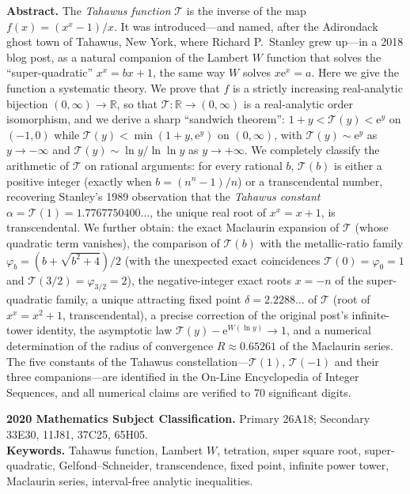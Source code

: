 \documentclass[11pt,a4paper]{article}
\theoremstyle{plain}
\theoremstyle{definition}
\theoremstyle{remark}
\newcommand{\Tah}{\mathcal{T}}                     %
\newcommand{\R}{\mathbb{R}}
\newcommand{\ee}{\mathrm{e}}
\begin{document}
\vspace{10pt}
\begin{center}
\begin{minipage}{0.88\textwidth}
\small
\textbf{Abstract.}
The \emph{Tahawus function} $\Tah$ is the inverse of the map
$f(x) = (x^{x}-1)/x$. It was introduced---and named, after the
Adirondack ghost town of Tahawus, New York, where Richard P.~Stanley
grew up---in a 2018 blog post, as a natural companion of the
Lambert $W$ function that solves the ``super-quadratic''
$x^{x} = bx + 1$, the same way $W$ solves $x \ee^{x} = a$. Here we give the
function a systematic theory. We prove that $f$ is a strictly increasing
real-analytic bijection $(0,\infty) \to \R$, so that $\Tah \colon \R \to
(0,\infty)$ is a real-analytic order isomorphism, and we derive a sharp
``sandwich theorem'': $1 + y < \Tah(y) < \ee^{y}$ on $(-1,0)$ while
$\Tah(y) < \min(1+y,\ee^{y})$ on $(0,\infty)$, with
$\Tah(y) \sim \ee^{y}$ as $y \to -\infty$ and
$\Tah(y) \sim \ln y / \ln\ln y$ as $y \to +\infty$. We completely
classify the arithmetic of $\Tah$ on rational arguments: for every
rational $b$, $\Tah(b)$ is either a positive integer (exactly when
$b = (n^{n}-1)/n$) or a transcendental number, recovering Stanley's
1989 observation that the \emph{Tahawus constant}
$\alpha = \Tah(1) = 1.7767750400\ldots$, the unique real root of
$x^{x} = x + 1$, is transcendental. We further obtain: the exact
Maclaurin expansion of $\Tah$ (whose quadratic term vanishes), the
comparison of $\Tah(b)$ with the metallic-ratio family
$\varphi_b = (b+\sqrt{b^{2}+4})/2$ (with the unexpected exact
coincidences $\Tah(0) = \varphi_0 = 1$ and $\Tah(3/2) =
\varphi_{3/2} = 2$), the negative-integer exact roots
$x = -n$ of the super-quadratic family, a unique attracting fixed
point $\delta = 2.2288\ldots$ of $\Tah$ (root of $x^{x} = x^{2}+1$,
transcendental), a precise correction of the original post's infinite-tower
identity, the asymptotic law $\Tah(y) - \ee^{W(\ln y)} \to 1$, and a
numerical determination of the radius of convergence
$R \approx 0.65261$ of the Maclaurin series. The five constants of the
Tahawus constellation---$\Tah(1)$, $\Tah(-1)$ and their three
companions---are identified in the On-Line Encyclopedia of Integer
Sequences, and all
numerical claims are verified to 70 significant digits.

\vspace{8pt}
\textbf{2020 Mathematics Subject Classification.}
Primary 26A18; Secondary 33E30, 11J81, 37C25, 65H05.\\[2pt]
\textbf{Keywords.} Tahawus function, Lambert $W$, tetration, super
square root, super-quadratic, Gelfond--Schneider, transcendence,
fixed point, infinite power tower, Maclaurin series, interval-free
analytic inequalities.
\end{minipage}
\end{center}
\end{document}
